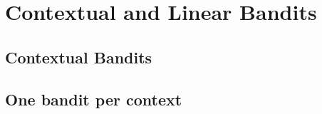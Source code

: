 \documentclass{article}
\begin{document}
\section{Contextual and Linear Bandits}
\subsection{Contextual Bandits}
\subsection{One bandit per context}
\end{document}
